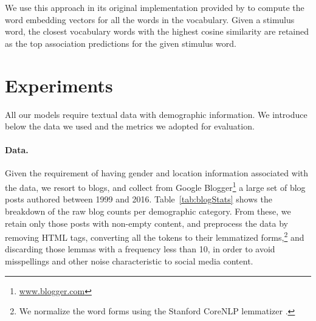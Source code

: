 \documentclass[11pt,letterpaper]{article}
\newcommand{\tabref}[1]{Table~\ref{#1}} %
\begin{document}
We use this approach in its original implementation provided by \cite{Bamman2014} to compute the word embedding vectors for all the words in the vocabulary.
Given a stimulus word, the closest vocabulary words with the highest cosine similarity are retained as the top association predictions for the given stimulus word.


\section{Experiments}
All our models require textual data with demographic information. We introduce below the data we used and the metrics we adopted for evaluation.

\paragraph{Data.}
Given the requirement of having gender and location information associated with the data, we resort to blogs, and collect from Google Blogger\footnote{\url{www.blogger.com}} a large set of blog posts  authored between 1999 and 2016. \tabref{tab:blogStats} shows the breakdown of the raw blog counts per demographic category. From these, we retain only those posts with non-empty content, and preprocess the data by removing HTML tags, converting all the tokens to their lemmatized forms,\footnote{We normalize the word forms using the Stanford CoreNLP lemmatizer \cite{Manning14}.} and discarding those lemmas with a frequency less than 10, in order to avoid misspellings and other noise characteristic to social media content.


\begin{table}[ht]
\centering
{}
\caption{Raw and balanced blog dataset statistics.}
\label{tab:blogStats}
\end{table}
\end{document}
